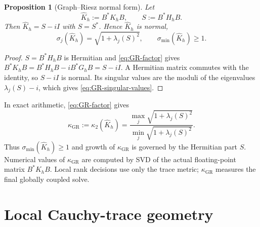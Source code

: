 \documentclass[11pt]{article}
\newtheorem{proposition}[theorem]{Proposition}
\newcommand{\ii}{i}
\newcommand{\GR}{\mathrm{GR}}
\numberwithin{equation}{section}
\begin{document}
\begin{proposition}[Graph--Riesz normal form]\label{prop:GR}
Let
\begin{equation}\label{eq:Khat-def}
 \widehat K_h:=B^*K_hB,\qquad S:=B^*H_hB.
\end{equation}
Then $\widehat K_h=S-\ii I$ with $S=S^*$.  Hence $\widehat K_h$ is normal,
\begin{equation}\label{eq:GR-singular-values}
 \sigma_j(\widehat K_h)=\sqrt{1+\lambda_j(S)^2},\qquad
 \sigma_{\min}(\widehat K_h)\ge1.
\end{equation}
\end{proposition}
\begin{proof}
$S=B^*H_hB$ is Hermitian and \eqref{eq:GR-factor} gives
$B^*K_hB=B^*H_hB-\ii B^*G_hB=S-\ii I$.  A Hermitian matrix commutes with the identity, so $S-\ii I$ is normal.  Its singular values are the moduli of the eigenvalues $\lambda_j(S)-\ii$, which gives \eqref{eq:GR-singular-values}.
\end{proof}

In exact arithmetic, \eqref{eq:GR-factor} gives
\begin{equation}\label{eq:kappa-GR-def}
 \kappa_{\GR}:=\kappa_2(\widehat K_h)
 =\frac{\max_j\sqrt{1+\lambda_j(S)^2}}
        {\min_j\sqrt{1+\lambda_j(S)^2}}.
\end{equation}
Thus $\sigma_{\min}(\widehat K_h)\ge1$ and growth of $\kappa_{\GR}$ is governed by the Hermitian part $S$.  Numerical values of $\kappa_{\GR}$ are computed by SVD of the actual floating-point matrix $B^*K_hB$.  Local rank decisions use only the trace metric; $\kappa_{\GR}$ measures the final globally coupled solve.

\section{Local Cauchy-trace geometry}\label{sec:trace-theory}
\end{document}
